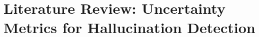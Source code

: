 \documentclass[11pt,a4paper]{article}
\begin{document}
\section{Literature Review: Uncertainty Metrics for Hallucination Detection}





\end{document}
